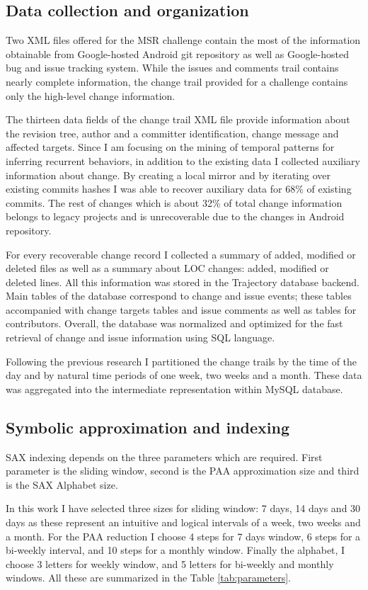 \documentclass[10pt, conference, compsocconf]{IEEEtran}
\begin{document}
\subsection{Data collection and organization}
Two XML files offered for the MSR challenge contain the most of the information obtainable 
from Google-hosted Android git repository as well as Google-hosted bug and issue tracking system.
While the issues and comments trail contains nearly complete information, the change trail 
provided for a challenge contains only the high-level change information. 

The thirteen data fields of the change trail XML file provide information about the revision 
tree, author and a committer identification, change message and affected targets. 
Since I am focusing on the mining of temporal patterns for inferring recurrent behaviors, 
in addition to the existing data I collected auxiliary information about change. By creating
a local mirror and by iterating over existing commits hashes I was able to recover auxiliary 
data for 68\% of existing commits. The rest of changes which is about 32\% of total change 
information belongs to legacy projects and is unrecoverable due to the changes in Android repository. 

For every recoverable change record I collected a summary of added, modified or deleted files 
as well as a summary about LOC changes: added, modified or deleted lines. All this information 
was stored in the Trajectory database backend. Main tables of the database correspond to change 
and issue events; these tables accompanied with change targets tables and issue comments as 
well as tables for contributors. Overall, the database was normalized and optimized for the fast 
retrieval of change and issue information using SQL language.

Following the previous research I partitioned the change trails by the time of the day and 
by natural time periods of one week, two weeks and a month. These data was aggregated into the 
intermediate representation within MySQL database.

\subsection{Symbolic approximation and indexing}
SAX indexing depends on the three parameters which are required. First parameter is
the sliding window, second is the PAA approximation size and third is the SAX Alphabet size.

In this work I have selected three sizes for sliding window: 7 days, 14 days and 30 days as 
these represent an intuitive and logical intervals of a week, two weeks and a month. 
For the PAA reduction I choose 4 steps for 7 days window, 6 steps for a bi-weekly interval,
and 10 steps for a monthly window.
Finally the alphabet, I choose 3 letters for weekly window, and 5 letters for bi-weekly and monthly windows.
All these are summarized in the Table \ref{tab:parameters}.
\end{document}
